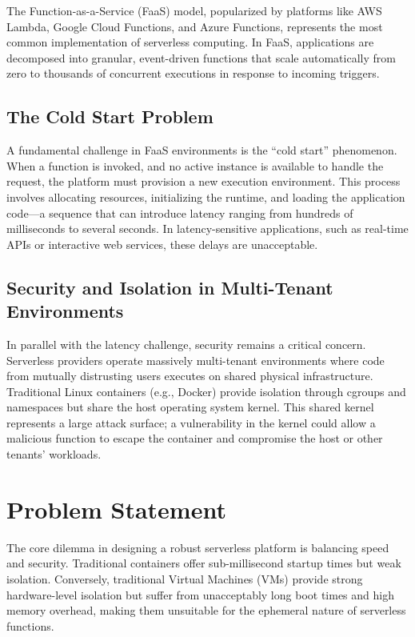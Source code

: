 \documentclass[12pt,a4paper]{report}
\begin{document}
The Function-as-a-Service (FaaS) model, popularized by platforms like AWS Lambda, Google Cloud Functions, and Azure Functions, represents the most common implementation of serverless computing. In FaaS, applications are decomposed into granular, event-driven functions that scale automatically from zero to thousands of concurrent executions in response to incoming triggers.

\subsection{The Cold Start Problem}
A fundamental challenge in FaaS environments is the ``cold start'' phenomenon. When a function is invoked, and no active instance is available to handle the request, the platform must provision a new execution environment. This process involves allocating resources, initializing the runtime, and loading the application code—a sequence that can introduce latency ranging from hundreds of milliseconds to several seconds. In latency-sensitive applications, such as real-time APIs or interactive web services, these delays are unacceptable.

\subsection{Security and Isolation in Multi-Tenant Environments}
In parallel with the latency challenge, security remains a critical concern. Serverless providers operate massively multi-tenant environments where code from mutually distrusting users executes on shared physical infrastructure. Traditional Linux containers (e.g., Docker) provide isolation through cgroups and namespaces but share the host operating system kernel. This shared kernel represents a large attack surface; a vulnerability in the kernel could allow a malicious function to escape the container and compromise the host or other tenants' workloads.

\section{Problem Statement}
The core dilemma in designing a robust serverless platform is balancing speed and security. Traditional containers offer sub-millisecond startup times but weak isolation. Conversely, traditional Virtual Machines (VMs) provide strong hardware-level isolation but suffer from unacceptably long boot times and high memory overhead, making them unsuitable for the ephemeral nature of serverless functions.
\end{document}
